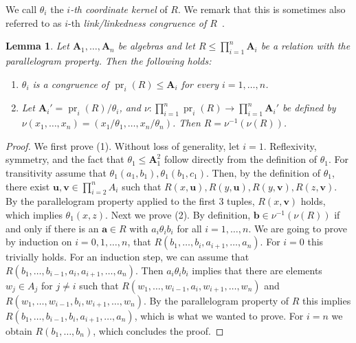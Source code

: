 \documentclass[12pt]{amsart}
\newtheorem{lemma}[theorem]{Lemma}
\theoremstyle{definition}
\theoremstyle{definition}
\newcommand{\alg}[1]{\mathbf{#1}}
\newcommand{\algA}{\alg{A}}
\DeclareMathOperator{\pr}{pr}
\begin{document}
We call $\theta_i$ the \emph{$i$-th coordinate kernel} of $R$. We remark that this is sometimes also referred to as $i$-th \emph{link/linkedness congruence of $R$}~\cite{Zeb}.

\begin{lemma} \label{lemma:reduced}
Let $\algA_1,\ldots,\algA_n$ be algebras and let $R \leq \prod_{i=1}^n \alg{A}_i$ be a relation with the parallelogram property. Then the following holds: 

\begin{enumerate}
    \item $\theta_i$ is a congruence of $\pr_i(R) \leq \alg{A}_i$ for every $i=1,\ldots,n$.
    \item Let $\algA_i' = \pr_i(R)/\theta_i$, and $\nu \colon \prod_{i = 1}^n \pr_i(R) \to \prod_{i = 1}^n \alg{A}_i'$ be defined by $\nu(x_1,\ldots,x_n) = (x_1/\theta_1,\ldots,x_n/\theta_n)$. Then $R = \nu^{-1}(\nu (R))$.
\end{enumerate}
\end{lemma}

\begin{proof}
    We first prove (1). Without loss of generality, let $i=1$. Reflexivity, symmetry, and the fact that $\theta_1 \leq \alg A_1^2$ follow directly from the definition of $\theta_1$. For transitivity assume that $\theta_1(a_1,b_1), \theta_1(b_1,c_1)$. Then, by the definition of $\theta_1$, there exist $\boldsymbol{u}, \boldsymbol{v} \in \prod_{i = 2}^nA_i$ such that $R(x, \boldsymbol{u}), R(y, \boldsymbol{u}), R(y, \boldsymbol{v}), R(z, \boldsymbol{v})$. By the parallelogram property applied to the first 3 tuples, $R(x, \boldsymbol{v})$ holds, which implies $ \theta_1(x,z)$. 
Next we prove (2). By definition, $\boldsymbol{b} \in \nu^{-1}(\nu (R))$ if and only if there is an $\boldsymbol{a} \in R$ with $a_i \theta_i b_i$ for all $i=1,\ldots,n$. We are going to prove by induction on $i=0,1,\ldots,n$, that $R(b_1,\ldots,b_i,a_{i+1},\ldots,a_n)$. For $i=0$ this trivially holds. For an induction step, we can assume that $R(b_1,\ldots,b_{i-1},a_i,a_{i+1},\ldots,a_n)$. Then $a_i \theta_i b_i$ implies that there are elements $w_j \in A_j$ for $j\neq i$ such that $R(w_1,\ldots,w_{i-1},a_i,w_{i+1},\ldots,w_n)$ and $R(w_1,\ldots,w_{i-1},b_i,w_{i+1},\ldots,w_n)$. By the parallelogram property of $R$ this implies $R(b_1,\ldots,b_{i-1},b_i,a_{i+1},\ldots,a_n)$, which is what we wanted to prove. For $i=n$ we obtain $R(b_1,\ldots,b_n)$, which concludes the proof.
\end{proof}
\end{document}
